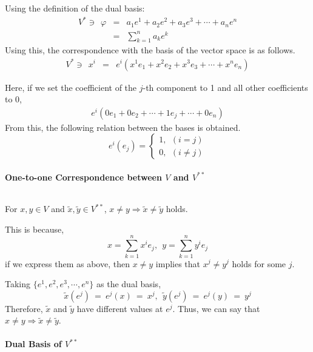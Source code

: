 \documentclass[uplatex,a4j,12pt,dvipdfmx]{jsarticle}
\begin{document}
Using the definition of the dual basis:
\[
	\begin{array}{rcl}
		V^{*} \ni \ \ \varphi
		 & = &
		a_{1} e^{1} + a_{2} e^{2} + a_{3} e^{3} + \cdots + a_{n} e^{n}
		\\
		 & = &
		\displaystyle \sum_{k=1}^{n} a_{k} e^{k}
	\end{array}
\]
Using this, the correspondence with the basis of the vector space is as follows.
\[
	\begin{array}{rcl}
		V^{*} \ni \ \ x^{i}
		 & = &
		e^{i} (x^{1} e_{1} + x^{2} e_{2} + x^{3} e_{3} + \cdots + x^{n} e_{n})
	\end{array}
\]

Here, if we set the coefficient of the $j$-th component to 1 and all other coefficients to 0,
\[
	\begin{array}{rcl}
		e^{i} (0 e_{1} + 0 e_{2}  + \cdots + 1 e_{j} + \cdots + 0 e_{n})
	\end{array}
\]
From this, the following relation between the bases is obtained.
\[
	e^{i}(e_{j})
	=
	\left\{
	\begin{array}{l}
		1, \ \ (i=j) \\
		0, \ \ (i \neq j)
	\end{array}
	\right.
\]

\paragraph{One-to-one Correspondence between $V$ and $V^{**}$}

${}$

For $x,y \in V$ and $\tilde{x}, \tilde{y} \in V^{**}$,
$x \neq y \Rightarrow \tilde{x} \neq \tilde{y}$ holds.

This is because,
$$
	x = \sum_{k=1}^{n} x^{i} e_{j} , \ \
	y = \sum_{k=1}^{n} y^{i} e_{j}
$$
if we express them as above, then $x \neq y$ implies that
$x^{j} \neq y^{j}$ holds for some $j$.

Taking
$\{ e^{1}, e^{2}, e^{3}, \cdots , e^{n} \}$
as the dual basis,
$$
	\tilde{x}(e^{j})
	\ = \
	e^{j}(x)
	\ = \
	x^{j}
	, \ \
	\tilde{y}(e^{j})
	\ = \
	e^{j}(y)
	\ = \
	y^{j}
$$
Therefore,
$\tilde{x}$ and $\tilde{y}$ have different values at $e^{j}$.
Thus, we can say that
$x \neq y \Rightarrow \tilde{x} \neq \tilde{y}$.

\paragraph{Dual Basis of $V^{**}$}
\end{document}
